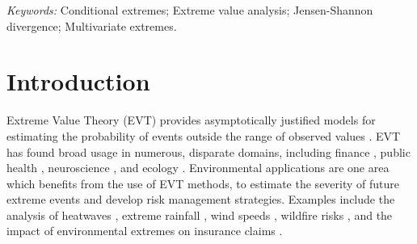 \documentclass[12pt,compact]{article}
\begin{document}
\noindent%
{\it Keywords:} Conditional extremes; Extreme value analysis; Jensen-Shannon divergence; Multivariate extremes.
\vfill

\newpage
{} %

\setlength{\textfloatsep}{10pt plus 1pt minus 2pt}
\setlength{\intextsep}{8pt plus 1pt minus 2pt}
\setlength{\floatsep}{8pt plus 1pt minus 2pt}

\setlength{\abovedisplayskip}{8pt plus 2pt minus 4pt}
\setlength{\belowdisplayskip}{8pt plus 2pt minus 4pt}
\setlength{\abovedisplayshortskip}{4pt plus 2pt minus 4pt}
\setlength{\belowdisplayshortskip}{4pt plus 2pt minus 4pt}

\section{Introduction}
\label{sec:intro}
Extreme Value Theory (EVT) provides asymptotically justified models for estimating the probability of events outside the range of observed values \citep{Coles2001}.
EVT has found broad usage in numerous, disparate domains, including finance \citep{Poon2004}, public health \citep{Vettori2019}, neuroscience \citep{Talento2025}, and ecology \citep{Koh2025}.
Environmental applications are one area which benefits from the use of EVT methods, to estimate the severity of future extreme events and develop risk management strategies. 
Examples include the analysis of heatwaves \citep{tanarhte2015heat, french2019quantifying}, extreme rainfall \citep{osei2021estimation}, wind speeds \citep{steinkohl2013extreme, soukissian2015effect}, wildfire risks \citep{Koh2023}, and the impact of environmental extremes on insurance claims \citep{Rohrbeck_flooding_2018, Miralles2024}.
\end{document}
